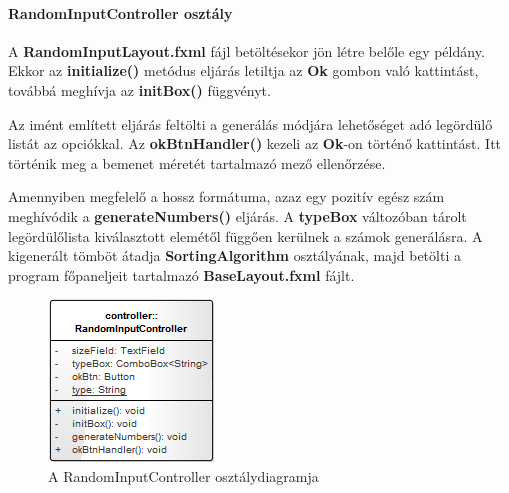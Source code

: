 \documentclass{elteikthesis}
\begin{document}
\paragraph{RandomInputController osztály}
A \textbf{RandomInputLayout.fxml} fájl betöltésekor jön létre belőle egy példány. Ekkor az \textbf{initialize()} metódus eljárás letiltja az \textbf{Ok} gombon való kattintást, továbbá meghívja az \textbf{initBox()} függvényt.\par
Az imént említett eljárás feltölti a generálás módjára lehetőséget adó legördülő listát az opciókkal. Az \textbf{okBtnHandler()} kezeli az \textbf{Ok}-on történő kattintást. Itt történik meg a bemenet méretét tartalmazó mező ellenőrzése.\par Amennyiben megfelelő a hossz formátuma, azaz egy pozitív egész szám meghívódik a \textbf{generateNumbers()} eljárás. A \textbf{typeBox} változóban tárolt legördülőlista kiválasztott elemétől függően kerülnek a számok generálásra. A kigenerált tömböt átadja \textbf{SortingAlgorithm} osztályának, majd betölti a program főpaneljeit tartalmazó \textbf{BaseLayout.fxml} fájlt.
\begin{figure}[H]
	\centering
	\includegraphics{pics/class/RandomInputController.png}
	\caption{A RandomInputController osztálydiagramja}
\end{figure}
\end{document}

